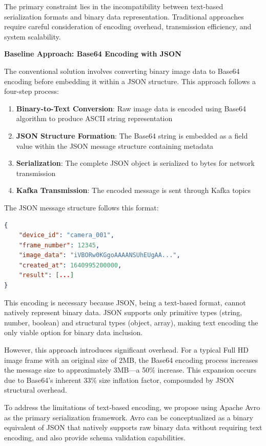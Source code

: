 \documentclass[../main.tex]{subfiles}
\begin{document}
The primary constraint lies in the incompatibility between text-based serialization formats and binary data representation. Traditional approaches require careful consideration of encoding overhead, transmission efficiency, and system scalability.

\textbf{Baseline Approach: Base64 Encoding with JSON}

The conventional solution involves converting binary image data to Base64 encoding before embedding it within a JSON structure. This approach follows a four-step process:

\begin{enumerate}
    \item \textbf{Binary-to-Text Conversion}: Raw image data is encoded using Base64 algorithm to produce ASCII string representation
    \item \textbf{JSON Structure Formation}: The Base64 string is embedded as a field value within the JSON message structure containing metadata
    \item \textbf{Serialization}: The complete JSON object is serialized to bytes for network transmission
    \item \textbf{Kafka Transmission}: The encoded message is sent through Kafka topics
\end{enumerate}

The JSON message structure follows this format:

\begin{lstlisting}[language=json, caption={JSON message structure with Base64 encoded image data}]
{
    "device_id": "camera_001",
    "frame_number": 12345,
    "image_data": "iVBORw0KGgoAAAANSUhEUgAA...",
    "created_at": 1640995200000,
    "result": [...]
}
\end{lstlisting}

This encoding is necessary because JSON, being a text-based format, cannot natively represent binary data. JSON supports only primitive types (string, number, boolean) and structural types (object, array), making text encoding the only viable option for binary data inclusion.

However, this approach introduces significant overhead. For a typical Full HD image frame with an original size of 2MB, the Base64 encoding process increases the message size to approximately 3MB—a 50\% increase. This expansion occurs due to Base64's inherent 33\% size inflation factor, compounded by JSON structural overhead.


To address the limitations of text-based encoding, we propose using Apache Avro as the primary serialization framework. Avro can be conceptualized as a binary equivalent of JSON that natively supports raw binary data without requiring text encoding, and also provide schema validation capabilities.
\end{document}
